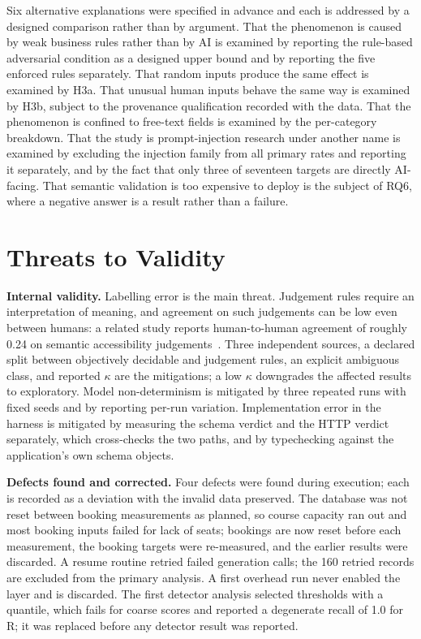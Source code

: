 \documentclass[conference]{IEEEtran}
\begin{document}
Six alternative explanations were specified in advance and each is addressed by a designed
comparison rather than by argument. That the phenomenon is caused by weak business rules rather than
by AI is examined by reporting the rule-based adversarial condition as a designed upper bound and by
reporting the five enforced rules separately. That random inputs produce the same effect is examined
by H3a. That unusual human inputs behave the same way is examined by H3b, subject to the provenance
qualification recorded with the data. That the phenomenon is confined to free-text fields is examined
by the per-category breakdown. That the study is prompt-injection research under another name is
examined by excluding the injection family from all primary rates and reporting it separately, and by
the fact that only three of seventeen targets are directly AI-facing. That semantic validation is too
expensive to deploy is the subject of RQ6, where a negative answer is a result rather than a failure.

\section{Threats to Validity}
\label{sec:threats}

\textbf{Internal validity.} Labelling error is the main threat. Judgement rules require an
interpretation of meaning, and agreement on such judgements can be low even between humans: a related
study reports human-to-human agreement of roughly 0.24 on semantic accessibility
judgements~\cite{calo2026semanticgap}. Three independent sources, a declared split between
objectively decidable and judgement rules, an explicit ambiguous class, and reported $\kappa$ are the
mitigations; a low $\kappa$ downgrades the affected results to exploratory. Model non-determinism is
mitigated by three repeated runs with fixed seeds and by reporting per-run variation. Implementation
error in the harness is mitigated by measuring the schema verdict and the HTTP verdict separately,
which cross-checks the two paths, and by typechecking against the application's own schema objects.

\textbf{Defects found and corrected.} Four defects were found during execution; each is recorded
as a deviation with the invalid data preserved. The database was not reset between booking
measurements as planned, so course capacity ran out and most booking inputs failed for lack of seats;
bookings are now reset before each measurement, the booking targets were re-measured, and the
earlier results were discarded. A resume routine retried failed generation calls; the 160 retried
records are excluded from the primary analysis. A first overhead run never enabled the layer and is
discarded. The first detector analysis selected thresholds with a quantile, which fails for coarse
scores and reported a degenerate recall of 1.0 for R; it was replaced before any detector result was
reported.
\end{document}
